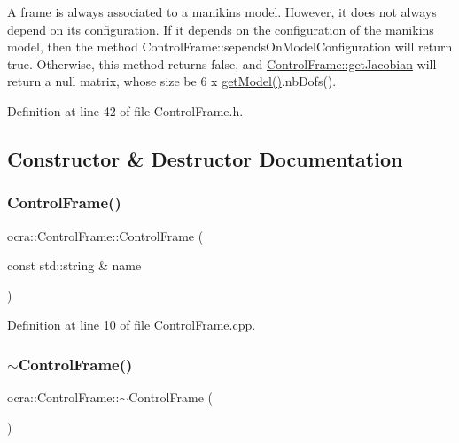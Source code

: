 A frame is always associated to a manikin\textquotesingle{}s model. However, it does not always depend on its configuration. If it depends on the configuration of the manikin\textquotesingle{}s model, then the method Control\+Frame\+::sepends\+On\+Model\+Configuration will return true. Otherwise, this method returns false, and \hyperlink{classocra_1_1ControlFrame_a14e0b855979be5dbd360314f25191e77}{Control\+Frame\+::get\+Jacobian} will return a null matrix, whose size be 6 x \hyperlink{classocra_1_1ControlFrame_ab8a1e5e3d96d7524112b4c88bf0bc5ee}{get\+Model()}.nb\+Dofs(). 

Definition at line 42 of file Control\+Frame.\+h.



\subsection{Constructor \& Destructor Documentation}
\hypertarget{classocra_1_1ControlFrame_a8ce978cbe6393c6baa232826c48aec55}{}\label{classocra_1_1ControlFrame_a8ce978cbe6393c6baa232826c48aec55} 
\subsubsection{\texorpdfstring{Control\+Frame()}{ControlFrame()}}
{\footnotesize\ttfamily ocra\+::\+Control\+Frame\+::\+Control\+Frame (\begin{DoxyParamCaption}\item[{const std\+::string \&}]{name }\end{DoxyParamCaption})\hspace{0.3cm}{\ttfamily [protected]}}



Definition at line 10 of file Control\+Frame.\+cpp.

\hypertarget{classocra_1_1ControlFrame_abfbbf55462bf1b256f12316ae3abe357}{}\label{classocra_1_1ControlFrame_abfbbf55462bf1b256f12316ae3abe357} 
\subsubsection{\texorpdfstring{$\sim$\+Control\+Frame()}{~ControlFrame()}}
{\footnotesize\ttfamily ocra\+::\+Control\+Frame\+::$\sim$\+Control\+Frame (\begin{DoxyParamCaption}{ }\end{DoxyParamCaption})\hspace{0.3cm}{\ttfamily [pure virtual]}}



